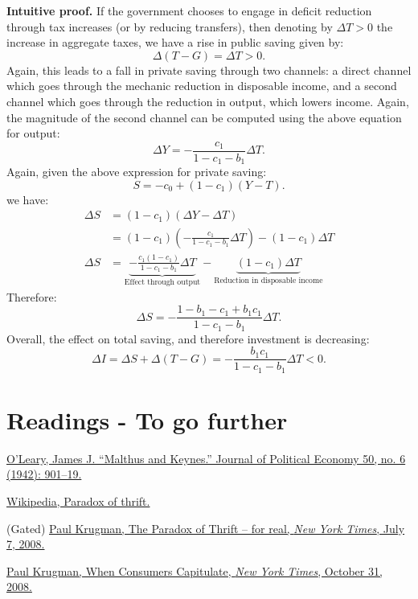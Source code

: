 \documentclass[]{book}
\theoremstyle{definition}
\theoremstyle{definition}
\theoremstyle{definition}
\theoremstyle{remark}
\begin{document}
\textbf{Intuitive proof.} If the government chooses to engage in deficit
reduction through tax increases (or by reducing transfers), then
denoting by \(\Delta T>0\) the increase in aggregate taxes, we have a
rise in public saving given by: \[\Delta(T-G)=\Delta T>0.\] Again, this
leads to a fall in private saving through two channels: a direct channel
which goes through the mechanic reduction in disposable income, and a
second channel which goes through the reduction in output, which lowers
income. Again, the magnitude of the second channel can be computed using
the above equation for output:
\[\Delta Y=-\frac{c_{1}}{1-c_{1}-b_{1}}\Delta T.\] Again, given the
above expression for private saving:
\[S=-c_{0}+\left(1-c_{1}\right)\left(Y-T\right).\] we have: \[
\begin{aligned}
\Delta S    &=(1-c_{1})(\Delta Y-\Delta T)\\
    &=(1-c_{1})\left(-\frac{c_{1}}{1-c_{1}-b_{1}}\Delta T\right)-(1-c_{1})\Delta T\\
\Delta S    &=\underbrace{-\frac{c_{1}(1-c_{1})}{1-c_{1}-b_{1}}\Delta T}_{\text{Effect through output}}-\underbrace{(1-c_{1})\Delta T}_{\text{Reduction in disposable income}}
\end{aligned}
\] Therefore:
\[\Delta S=-\frac{1-b_{1}-c_{1}+b_{1}c_{1}}{1-c_{1}-b_{1}}\Delta T.\]
Overall, the effect on total saving, and therefore investment is
decreasing:
\[\Delta I  =\Delta S+\Delta(T-G)=-\frac{b_{1}c_{1}}{1-c_{1}-b_{1}}\Delta T<0.\]

\section*{Readings - To go further}\label{readings---to-go-further-5}

\href{https://www.jstor.org/stable/1826621}{O'Leary, James J. ``Malthus
and Keynes.'' Journal of Political Economy 50, no. 6 (1942): 901--19.}

\href{https://en.wikipedia.org/wiki/Paradox_of_thrift}{Wikipedia,
Paradox of thrift.}

(Gated)
\href{https://krugman.blogs.nytimes.com/2009/07/07/the-paradox-of-thrift-for-real/}{Paul
Krugman, The Paradox of Thrift -- for real, \emph{New York Times}, July
7, 2008.}

\href{https://search.proquest.com/nytimes/docview/433945040/E76AA2F8F9C14A34PQ/2?accountid=14512}{Paul
Krugman, When Consumers Capitulate, \emph{New York Times}, October 31,
2008.}
\end{document}
